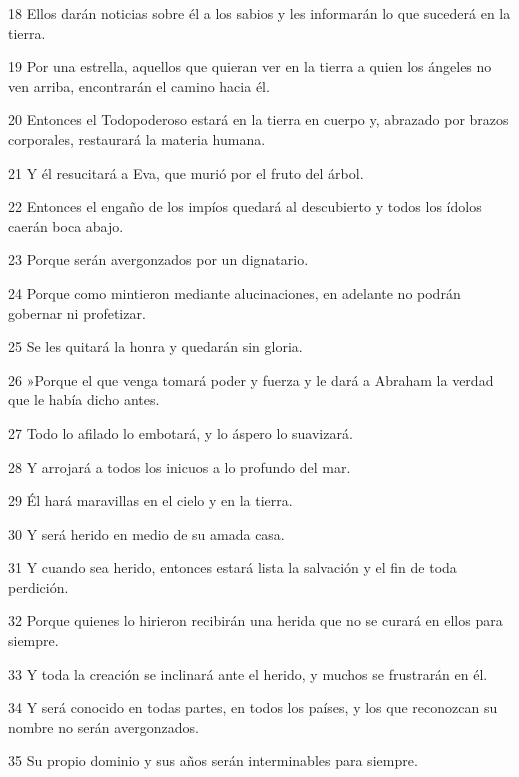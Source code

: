 \par 18 Ellos darán noticias sobre él a los sabios y les informarán lo que sucederá en la tierra.

\par 19 Por una estrella, aquellos que quieran ver en la tierra a quien los ángeles no ven arriba, encontrarán el camino hacia él.

\par 20 Entonces el Todopoderoso estará en la tierra en cuerpo y, abrazado por brazos corporales, restaurará la materia humana.

\par 21 Y él resucitará a Eva, que murió por el fruto del árbol.

\par 22 Entonces el engaño de los impíos quedará al descubierto y todos los ídolos caerán boca abajo.

\par 23 Porque serán avergonzados por un dignatario.

\par 24 Porque como mintieron mediante alucinaciones, en adelante no podrán gobernar ni profetizar.

\par 25 Se les quitará la honra y quedarán sin gloria.

\par 26 »Porque el que venga tomará poder y fuerza y ​​le dará a Abraham la verdad que le había dicho antes.

\par 27 Todo lo afilado lo embotará, y lo áspero lo suavizará.

\par 28 Y arrojará a todos los inicuos a lo profundo del mar.

\par 29 Él hará maravillas en el cielo y en la tierra.

\par 30 Y será herido en medio de su amada casa.

\par 31 Y cuando sea herido, entonces estará lista la salvación y el fin de toda perdición.

\par 32 Porque quienes lo hirieron recibirán una herida que no se curará en ellos para siempre.

\par 33 Y toda la creación se inclinará ante el herido, y muchos se frustrarán en él.

\par 34 Y será conocido en todas partes, en todos los países, y los que reconozcan su nombre no serán avergonzados.

\par 35 Su propio dominio y sus años serán interminables para siempre.

